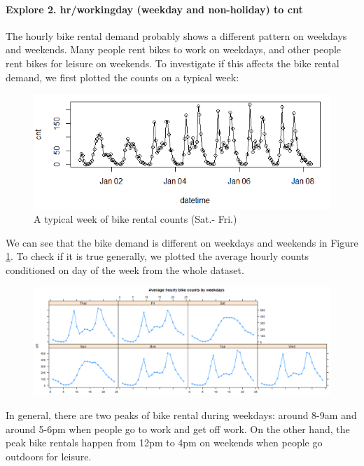 \documentclass[12pt]{article}
\begin{document}
	\paragraph*{Explore 2. hr/workingday (weekday and non-holiday) to cnt} The hourly bike rental demand probably shows a different pattern on weekdays and weekends. Many people rent bikes to work on weekdays, and other people rent bikes for leisure on weekends. To investigate if this affects the bike rental demand, we first plotted the counts on a typical week:
	\begin{figure}[H]
		\centering
		\includegraphics[scale=.9]{figures/week_cnt.png}
		\caption{A typical week of bike rental counts (Sat.- Fri.)}
		\label{fig:typical_week}
	\end{figure}
 We can see that the bike demand is different on weekdays and weekends in Figure \ref{fig:typical_week}. To check if it is true generally, we plotted the average hourly counts conditioned on day of the week from the whole dataset.
	\begin{figure}[H]
		\centering
		\includegraphics[scale=.5]{figures/hr_weekday.png}
	\end{figure}
	In general, there are two peaks of bike rental during weekdays: around 8-9am and around 5-6pm when people go to work and get off work. On the other hand, the peak bike rentals happen from 12pm to 4pm on weekends when people go outdoors for leisure. 
	
\end{document}
